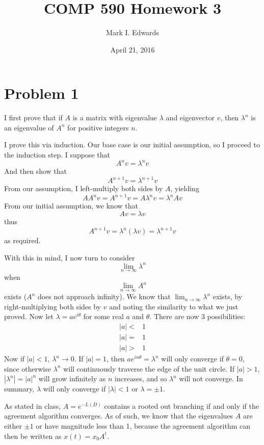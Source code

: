 \documentclass{article}
\title{COMP 590 Homework 3}
\author{Mark I. Edwards}
\date{April 21, 2016}
\begin{document}
\maketitle
\section*{Problem 1}
I first prove that if $A$ is a matrix with eigenvalue $\lambda$ and eigenvector
$v$, then $\lambda^n$ is an eigenvalue of $A^n$ for positive integers $n$. 

I prove this via induction. Our base case is our initial assumption, so I
proceed to the induction step. I suppose that
\[ A^n v = \lambda^n v \]
And then show that
\[ A^{n+1} v = \lambda^{n+1} v \]
From our assumption, I left-multiply both sides by $A$, yielding
\[ AA^n v = A^{n+1}v = A \lambda^n v = \lambda^n Av \]
From our initial assumption, we know that 
\[ Av = \lambda v \]
thus
\[ A^{n+1} v = \lambda^n (\lambda v) = \lambda^{n+1} v \]
as required. 

With this in mind, I now turn to consider 
\[ \lim_{n \rightarrow \infty} \lambda^n \]
when 
\[ \lim_{n \rightarrow \infty} A^n \]
exists ($A^n$ does not approach infinity). We know that $ \lim_{n \rightarrow
\infty} \lambda^n $ exists, by right-multiplying both sides by $v$ and noting
the similarity to what we just proved. Now let $\lambda = a e^{i\theta}$ for
some real $a$ and $\theta$. There are now 3 possibilities: 
\begin{align*}
|a| <& 1 \\
|a| =& 1 \\
|a| >& 1 
\end{align*}
Now if $|a| < 1$, $\lambda^n \rightarrow 0$. If $|a|=1$, then $ae^{in\theta} =
\lambda^n$ will only converge if $\theta = 0$, since otherwise $\lambda^n$ will
continuously traverse the edge of the unit circle. If $|a| > 1$, $|\lambda^n| =
|a|^n$ will grow infinitely as $n$ increases, and so $\lambda^n$ will not
converge. In summary, $\lambda$ will only converge if $|\lambda| < 1$ or
$\lambda = \pm 1$. 

As stated in class, $A = e^{-L(D)}$ contains a rooted out branching if and only
if the agreement algorithm converges. As of such, we know that the eigenvalues
$A$ are either $\pm 1$ or have magnitude less than 1, because the agreement
algorithm can then be written as $x(t) = x_0 A^t$. 
\end{document}
